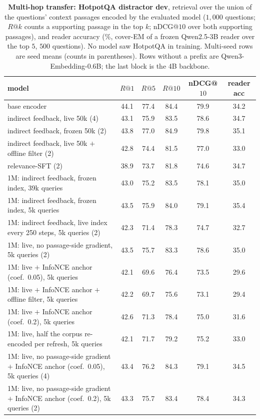 \begin{table}[H]
\centering\small
\caption{\textbf{Multi-hop transfer: HotpotQA distractor dev}, retrieval over the union of the questions'
context passages encoded by the evaluated model ($1{,}000$ questions; $R@k$ counts a supporting passage in the
top $k$; nDCG@$10$ over both supporting passages), and reader accuracy (\%, cover-EM of a frozen
Qwen2.5-3B reader over the top $5$, $500$ questions). No model saw HotpotQA in training. Multi-seed rows are
seed means (counts in parentheses). Rows without a prefix are Qwen3-Embedding-0.6B; the last block is the 4B backbone.}
\label{tab:rag_hotpot}
\begin{tabular}{lccccc}
\toprule
model & $R@1$ & $R@5$ & $R@10$ & nDCG@$10$ & reader acc \\
\midrule
base encoder & 44.1 & 77.4 & 84.4 & 79.9 & 34.2 \\
indirect feedback, live 50k (4) & 43.1 & 75.9 & 83.5 & 78.6 & 34.7 \\
indirect feedback, frozen 50k (2) & 43.8 & 77.0 & 84.9 & 79.8 & 35.1 \\
indirect feedback, live 50k $+$ offline filter (2) & 42.8 & 74.4 & 81.5 & 77.0 & 33.0 \\
relevance-SFT (2) & 38.9 & 73.7 & 81.8 & 74.6 & 34.7 \\
1M: indirect feedback, frozen index, 39k queries & 43.0 & 75.2 & 83.5 & 78.1 & 35.0 \\
1M: indirect feedback, frozen index, 5k queries & 43.5 & 75.9 & 84.0 & 79.1 & 35.4 \\
1M: indirect feedback, live index every 250 steps, 5k queries (2) & 42.3 & 71.4 & 78.3 & 74.7 & 32.7 \\
1M: live, no passage-side gradient, 5k queries (2) & 43.5 & 75.7 & 83.3 & 78.6 & 35.0 \\
1M: live $+$ InfoNCE anchor (coef.\ 0.05), 5k queries & 42.1 & 69.6 & 76.4 & 73.5 & 29.6 \\
1M: live $+$ InfoNCE anchor $+$ offline filter, 5k queries & 42.2 & 69.7 & 75.6 & 73.1 & 29.4 \\
1M: live $+$ InfoNCE anchor (coef.\ 0.2), 5k queries & 42.6 & 71.3 & 78.4 & 75.0 & 31.6 \\
1M: live, half the corpus re-encoded per refresh, 5k queries & 42.1 & 71.7 & 79.2 & 75.2 & 33.0 \\
1M: live, no passage-side gradient $+$ InfoNCE anchor (coef.\ 0.05), 5k queries (4) & 43.4 & 76.2 & 84.3 & 79.1 & 34.5 \\
1M: live, no passage-side gradient $+$ InfoNCE anchor (coef.\ 0.2), 5k queries (2) & 43.3 & 75.7 & 83.4 & 78.4 & 34.3 \\

\end{tabular}
\end{table}
